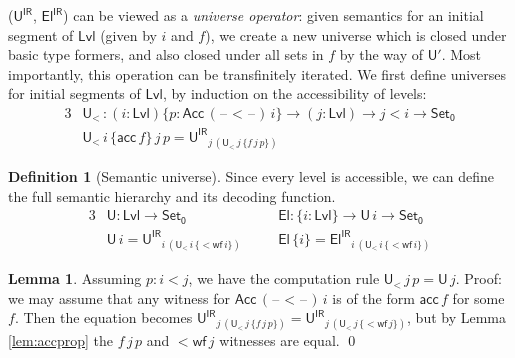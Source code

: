 \documentclass[a4paper,UKenglish,cleveref, autoref, thm-restate]{lipics-v2021}
\theoremstyle{remark}
\theoremstyle{definition}
\newtheorem{mydefinition}{Definition}
\newtheorem{mylemma}{Lemma}
\newcommand{\Set}[1]{\mathsf{Set_{#1}}}
\newcommand{\U}{\mathsf{U}}
\newcommand{\El}{\mathsf{El}}
\newcommand{\blank}{\mathord{\hspace{1pt}\text{--}\hspace{1pt}}}
\newcommand{\Acc}{\mathsf{Acc}}
\newcommand{\acc}{\mathsf{acc}}
\newcommand{\Lvl}{\mathsf{Lvl}}
\renewcommand{\U}{\mathsf{U}}
\newcommand{\msf}[1]{\mathsf{#1}}
\newcommand{\uir}{\msf{U^{IR}}}
\newcommand{\elir}{\msf{El^{IR}}}
\newcommand{\ult}{\U_{<}}
\begin{document}
($\uir$, $\elir$) can be viewed as a \emph{universe operator}: given semantics
for an initial segment of $\Lvl$ (given by $i$ and $f$), we create a new
universe which is closed under basic type formers, and also closed under all
sets in $f$ by the way of $\U'$. Most importantly, this operation can be
transfinitely iterated. We first define universes for initial segments of
$\Lvl$, by induction on the accessibility of levels:
\begin{alignat*}{3}
  & \ult\,: (i : \Lvl)\{p : \Acc\,(\blank\!<\!\blank)\,i\} \to (j : \Lvl) \to j < i \to \Set0 \\
  & \ult\,i\,\{\acc\,f\}\,j\,p = \uir_{j\,(\ult\,j\,\{f\,j\,p\})}
\end{alignat*}

\begin{mydefinition}[Semantic universe]
Since every level is accessible, we can define the full semantic hierarchy and
its decoding function.
\begin{alignat*}{3}
  &\U : \Lvl \to \Set0
     && \El : \{i : \Lvl\} \to \U\,i \to \Set0 \\
  &\U\,i = \uir_{i\,(\ult\,i\,\{\mathsf{<\!wf}\,i\})}\hspace{1em}
     && \El\,\{i\} = \elir_{i\,(\ult\,i\,\{\mathsf{<\!wf}\,i\})}
\end{alignat*}
\end{mydefinition}

\begin{mylemma}\label{lem:ucomp}
Assuming $p : i < j$, we have the computation rule $\ult\,j\,p = \U\,j$. Proof: we
may assume that any witness for $\Acc\,(\blank\!<\!\blank)\,i$ is of the form $\acc\,f$ for
some $f$. Then the equation becomes $\uir_{j\,(\ult\,j\,\{f\,j\,p\})} =
\uir_{j\,(\ult\,j\,\{\mathsf{<\!wf}\,j\})}$, but by Lemma \ref{lem:accprop}
the $f\,j\,p$ and $\mathsf{<\!wf}\,j$ witnesses are equal. \qed
\end{mylemma}
\end{document}
